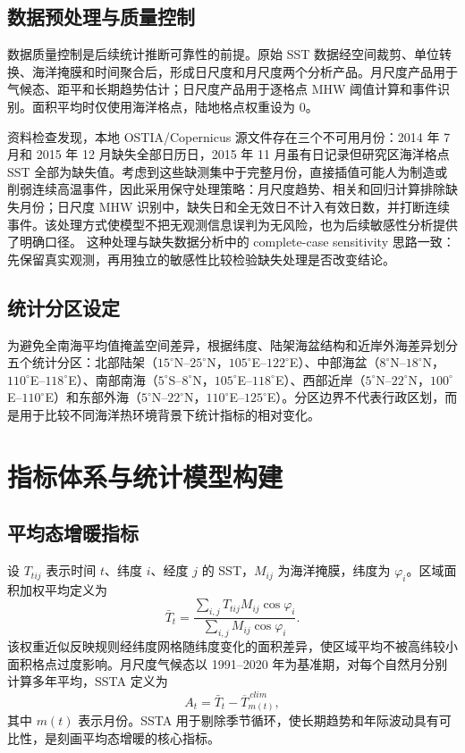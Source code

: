 \documentclass[UTF8,a4paper,zihao=-4,fontset=fandol]{ctexart}
\begin{document}
\subsection{数据预处理与质量控制}
数据质量控制是后续统计推断可靠性的前提。原始 SST 数据经空间裁剪、单位转换、海洋掩膜和时间聚合后，形成日尺度和月尺度两个分析产品。月尺度产品用于气候态、距平和长期趋势估计；日尺度产品用于逐格点 MHW 阈值计算和事件识别。面积平均时仅使用海洋格点，陆地格点权重设为 0。

资料检查发现，本地 OSTIA/Copernicus 源文件存在三个不可用月份：2014 年 7 月和 2015 年 12 月缺失全部日历日，2015 年 11 月虽有日记录但研究区海洋格点 SST 全部为缺失值。考虑到这些缺测集中于完整月份，直接插值可能人为制造或削弱连续高温事件，因此采用保守处理策略：月尺度趋势、相关和回归计算排除缺失月份；日尺度 MHW 识别中，缺失日和全无效日不计入有效日数，并打断连续事件。该处理方式使模型不把无观测信息误判为无风险，也为后续敏感性分析提供了明确口径。
这种处理与缺失数据分析中的 complete-case sensitivity 思路一致：先保留真实观测，再用独立的敏感性比较检验缺失处理是否改变结论\cite{little2019missing,schafer2002missing}。

\subsection{统计分区设定}
为避免全南海平均值掩盖空间差异，根据纬度、陆架海盆结构和近岸外海差异划分五个统计分区：北部陆架（$15^{\circ}$N--$25^{\circ}$N，$105^{\circ}$E--$122^{\circ}$E）、中部海盆（$8^{\circ}$N--$18^{\circ}$N，$110^{\circ}$E--$118^{\circ}$E）、南部南海（$5^{\circ}$S--$8^{\circ}$N，$105^{\circ}$E--$118^{\circ}$E）、西部近岸（$5^{\circ}$N--$22^{\circ}$N，$100^{\circ}$E--$110^{\circ}$E）和东部外海（$5^{\circ}$N--$22^{\circ}$N，$110^{\circ}$E--$125^{\circ}$E）。分区边界不代表行政区划，而是用于比较不同海洋热环境背景下统计指标的相对变化。

\section{指标体系与统计模型构建}

\subsection{平均态增暖指标}
设 $T_{tij}$ 表示时间 $t$、纬度 $i$、经度 $j$ 的 SST，$M_{ij}$ 为海洋掩膜，纬度为 $\varphi_i$。区域面积加权平均定义为
\begin{equation}
\bar{T}_{t}=\frac{\sum_{i,j}T_{tij}M_{ij}\cos\varphi_i}{\sum_{i,j}M_{ij}\cos\varphi_i}.
\end{equation}
该权重近似反映规则经纬度网格随纬度变化的面积差异，使区域平均不被高纬较小面积格点过度影响。月尺度气候态以 1991--2020 年为基准期，对每个自然月分别计算多年平均，SSTA 定义为
\begin{equation}
A_t=\bar{T}_t-\overline{T}_{m(t)}^{\,clim},
\end{equation}
其中 $m(t)$ 表示月份。SSTA 用于剔除季节循环，使长期趋势和年际波动具有可比性，是刻画平均态增暖的核心指标。
\end{document}
